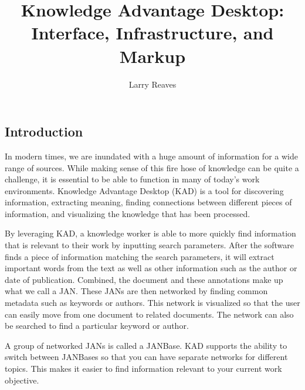 \documentclass{article}
\begin{document}
\title{Knowledge Advantage Desktop: Interface, Infrastructure, and Markup}
\author{Larry Reaves}
\maketitle
\pagebreak
\begin{doublespace}
\section{Introduction}
In modern times, we are inundated with a huge amount of information for a wide range of sources.
While making sense of this fire hose of knowledge can be quite a challenge, it is essential to be able
to function in many of today's work environments.
Knowledge Advantage Desktop (KAD) is a tool for discovering information, extracting meaning,
finding connections between different pieces of information,
and visualizing the knowledge that has been processed.
\par
By leveraging KAD, a knowledge worker is able to more quickly find information that is relevant to their
work by inputting search parameters.
After the software finds a piece of information matching the search parameters,
it will extract important words from the text as well as other information such as the author or date of publication.
Combined, the document and these annotations make up what we call a JAN.
These JANs are then networked by finding common metadata such as keywords or authors.
This network is visualized so that the user can easily move from one document to related documents.
The network can also be searched to find a particular keyword or author.
\par
A group of networked JANs is called a JANBase.
KAD supports the ability to switch between JANBases so that you can have separate networks for different topics.
This makes it easier to find information relevant to your current work objective.

\end{doublespace}
\end{document}
